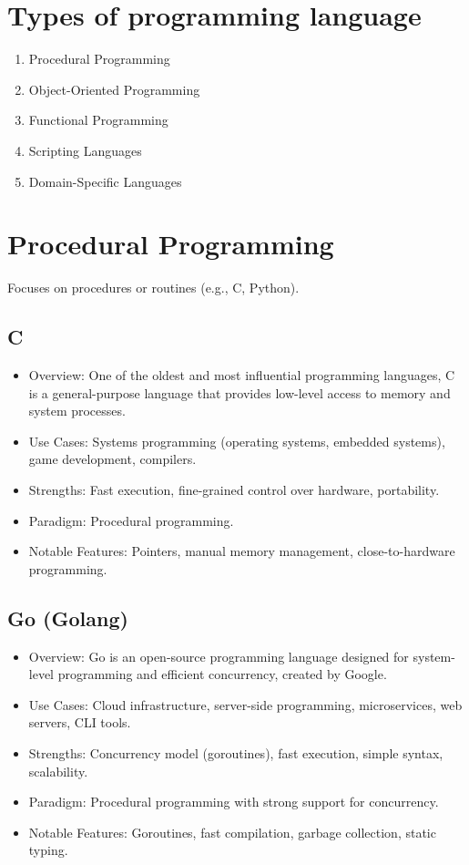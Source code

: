 \documentclass[openany]{book} %
\begin{document}

\section{Types of programming language}

\begin{enumerate}
\item Procedural Programming
\item Object-Oriented Programming
\item Functional Programming
\item Scripting Languages
\item Domain-Specific Languages
\end{enumerate}

\section{Procedural Programming}
Focuses on procedures or routines (e.g., C, Python).
\subsection{C}
\begin{itemize}
\item Overview: One of the oldest and most influential programming languages, C is a general-purpose language that provides low-level access to memory and system processes.
\item Use Cases: Systems programming (operating systems, embedded systems), game development, compilers.
\item Strengths: Fast execution, fine-grained control over hardware, portability.
\item Paradigm: Procedural programming.
\item Notable Features: Pointers, manual memory management, close-to-hardware programming.
\end{itemize}

\subsection{Go (Golang)}
\begin{itemize}
\item Overview: Go is an open-source programming language designed for system-level programming and efficient concurrency, created by Google.
\item Use Cases: Cloud infrastructure, server-side programming, microservices, web servers, CLI tools.
\item Strengths: Concurrency model (goroutines), fast execution, simple syntax, scalability.
\item Paradigm: Procedural programming with strong support for concurrency.
\item Notable Features: Goroutines, fast compilation, garbage collection, static typing.
\end{itemize}
\end{document}
